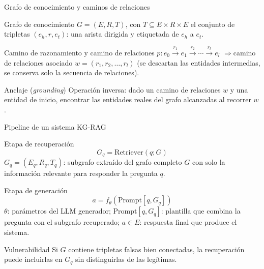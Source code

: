 \documentclass[aspectratio=169]{beamer}
\begin{document}
\begin{frame}{Grafo de conocimiento y caminos de relaciones}
  \begin{block}{Grafo de conocimiento}
    $G = (E, R, T)$, con $T \subseteq E \times R \times E$ el conjunto de
    tripletas $(e_h, r, e_t)$: una arista dirigida y etiquetada de $e_h$ a $e_t$.
  \end{block}
  \begin{block}{Camino de razonamiento y camino de relaciones}
    $p: e_0 \xrightarrow{r_1} e_1 \xrightarrow{r_2} \cdots \xrightarrow{r_l} e_l$
    \quad$\Rightarrow$\quad camino de relaciones asociado $w = (r_1, r_2, \dots, r_l)$
    (se descartan las entidades intermedias, se conserva solo la secuencia de relaciones).
  \end{block}
  \begin{block}{Anclaje (\emph{grounding})}
    Operación inversa: dado un camino de relaciones $w$ y una entidad de inicio,
    encontrar las entidades reales del grafo alcanzadas al recorrer $w$.
  \end{block}
\end{frame}

\begin{frame}{Pipeline de un sistema KG-RAG}
  \small
  \begin{block}{Etapa de recuperación}
    \[ G_q = \text{Retriever}(q; G) \tag{1} \]
    $G_q = (E_q, R_q, T_q)$: subgrafo extraído del grafo completo $G$ con solo
    la información relevante para responder la pregunta $q$.
  \end{block}
  \begin{block}{Etapa de generación}
    \[ a = f_\theta(\text{Prompt}[q, G_q]) \tag{2} \]
    $\theta$: parámetros del LLM generador; $\text{Prompt}[q, G_q]$: plantilla
    que combina la pregunta con el subgrafo recuperado; $a \in E$: respuesta
    final que produce el sistema.
  \end{block}
  \begin{alertblock}{Vulnerabilidad}
    Si $G$ contiene tripletas falsas bien conectadas, la recuperación puede
    incluirlas en $G_q$ sin distinguirlas de las legítimas.
  \end{alertblock}
\end{frame}
\end{document}
